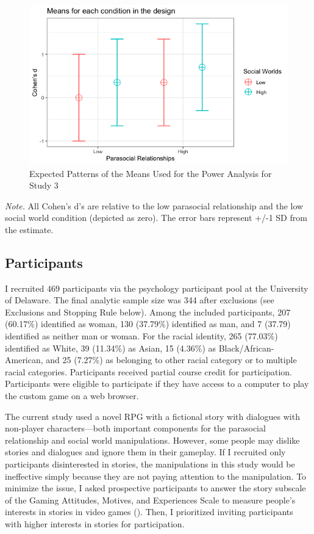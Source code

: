 \documentclass[
]{udthesis}
\begin{document}
\begin{figure}
\includegraphics[width=0.7\linewidth]{images/s3-expected-means} \caption{Expected Patterns of the Means Used for the Power Analysis for Study 3}\label{fig:s3-expected-means}
\end{figure}

\emph{Note.} All Cohen's d's are relative to the low parasocial relationship
and the low social world condition (depicted as zero). The error bars
represent +/-1 SD from the estimate.

\subsection{Participants}\label{participants-6}

I recruited 469 participants via the
psychology participant pool at the University of Delaware. The final
analytic sample size was 344 after exclusions
(see Exclusions and Stopping Rule below). Among the included
participants, 207 (60.17\%)
identified as woman, 130 (37.79\%)
identified as man, and 7 (37.79)
identified as neither man or woman. For the racial identity,
265 (77.03\%) identified as White,
39 (11.34\%) as Asian,
15
(4.36\%) as Black/African-American,
and 25
(7.27\%) as belonging to other racial
category or to multiple racial categories. Participants received partial
course credit for participation. Participants were eligible to
participate if they have access to a computer to play the custom game on
a web browser.

The current study used a novel RPG with a fictional story with dialogues
with non-player characters---both important components for the
parasocial relationship and social world manipulations. However, some
people may dislike stories and dialogues and ignore them in their
gameplay. If I recruited only participants disinterested in stories, the
manipulations in this study would be ineffective simply because they are
not paying attention to the manipulation. To minimize the issue, I asked
prospective participants to answer the story subscale of the Gaming
Attitudes, Motives, and Experiences Scale to measure people's interests
in stories in video games ().
Then, I prioritized inviting participants with higher interests in
stories for participation.
\end{document}
